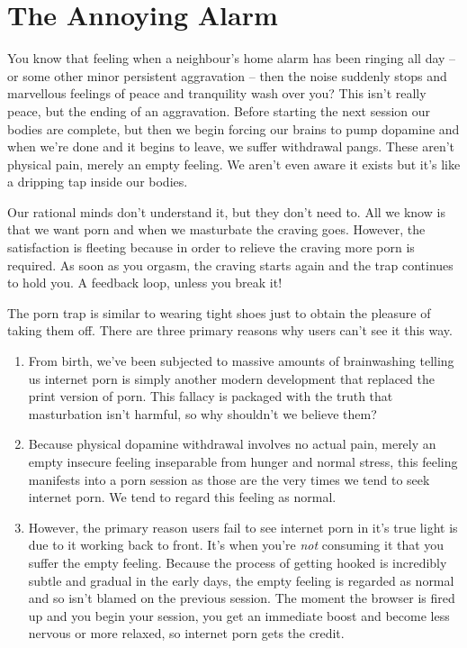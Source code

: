 \documentclass[
]{book}
\begin{document}
\hypertarget{the-annoying-alarm}{%
\section{The Annoying Alarm}\label{the-annoying-alarm}}

You know that feeling when a neighbour's home alarm has been ringing all day -- or some other minor persistent aggravation -- then the noise suddenly stops and marvellous feelings of peace and tranquility wash over you? This isn't really peace, but the ending of an aggravation. Before starting the next session our bodies are complete, but then we begin forcing our brains to pump dopamine and when we're done and it begins to leave, we suffer withdrawal pangs. These aren't physical pain, merely an empty feeling. We aren't even aware it exists but it's like a dripping tap inside our bodies.

Our rational minds don't understand it, but they don't need to. All we know is that we want porn and when we masturbate the craving goes. However, the satisfaction is fleeting because in order to relieve the craving more porn is required. As soon as you orgasm, the craving starts again and the trap continues to hold you. A feedback loop, unless you break it!

The porn trap is similar to wearing tight shoes just to obtain the pleasure of taking them off. There are three primary reasons why users can't see it this way.

\begin{enumerate}
\def\labelenumi{\arabic{enumi}.}
\item
  From birth, we've been subjected to massive amounts of brainwashing telling us internet porn is simply another modern development that replaced the print version of porn. This fallacy is packaged with the truth that masturbation isn't harmful, so why shouldn't we believe them?
\item
  Because physical dopamine withdrawal involves no actual pain, merely an empty insecure feeling inseparable from hunger and normal stress, this feeling manifests into a porn session as those are the very times we tend to seek internet porn. We tend to regard this feeling as normal.
\item
  However, the primary reason users fail to see internet porn in it's true light is due to it working back to front. It's when you're \emph{not} consuming it that you suffer the empty feeling. Because the process of getting hooked is incredibly subtle and gradual in the early days, the empty feeling is regarded as normal and so isn't blamed on the previous session. The moment the browser is fired up and you begin your session, you get an immediate boost and become less nervous or more relaxed, so internet porn gets the credit.
\end{enumerate}
\end{document}
